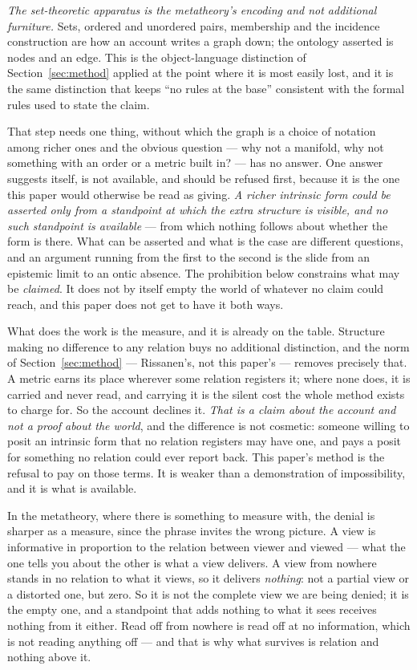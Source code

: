 \documentclass[11pt,a4paper]{article}
\begin{document}
\emph{The set-theoretic apparatus is the metatheory's encoding and not additional furniture.} Sets,
ordered and unordered pairs, membership and the incidence construction are how an account writes a
graph down; the ontology asserted is nodes and an edge. This is the object-language distinction of
Section~\ref{sec:method} applied at the point where it is most easily lost, and it is the same
distinction that keeps ``no rules at the base'' consistent with the formal rules used to state the
claim.

That step needs one thing, without which the graph is a choice of notation
among richer ones and the obvious question --- why not a manifold, why not something with an order or a
metric built in? --- has no answer. One answer suggests itself, is not available, and should be refused first, because it is the one this
paper would otherwise be read as giving. \emph{A richer intrinsic form could be asserted only from a
standpoint at which the extra structure is visible, and no such standpoint is available} --- from which
nothing follows about whether the form is there. What can be asserted and what is the case are
different questions, and an argument running from the first to the second is the slide from an
epistemic limit to an ontic absence. The prohibition below constrains what may be \emph{claimed}. It
does not by itself empty the world of whatever no claim could reach, and this paper does not get to
have it both ways.

What does the work is the measure, and it is already on the table. Structure making no difference to
any relation buys no additional distinction, and the norm of Section~\ref{sec:method} --- Rissanen's,
not this paper's --- removes precisely that. A metric earns its place wherever some relation registers
it; where none does, it is carried and never read, and carrying it is the silent cost the whole method
exists to charge for. So the account declines it. \emph{That is a claim about the account and not a
proof about the world}, and the difference is not cosmetic: someone willing to posit an intrinsic form
that no relation registers may have one, and pays a posit for something no relation could ever report
back. This paper's method is the refusal to pay on those terms. It is weaker than a demonstration of
impossibility, and it is what is available.

In the metatheory, where there is something to measure with, the denial is sharper as a measure, since
the phrase invites the wrong
picture. A view is informative in proportion to the relation between viewer and viewed --- what the one
tells you about the other is what a view delivers. A view from nowhere stands in no relation to what it
views, so it delivers \emph{nothing}: not a partial view or a distorted one, but zero. So it is not the
complete view we are being denied; it is the empty one, and a standpoint that adds nothing to what it
sees receives nothing from it either. Read off from nowhere is read off at no information, which is not
reading anything off --- and that is why what survives is relation and nothing above it.
\end{document}
